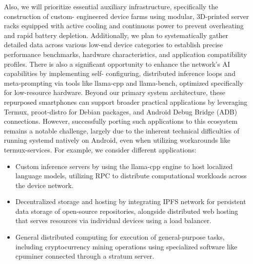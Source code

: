 Also, we will prioritize essential auxiliary infrastructure, specifically the construction of custom- engineered device farms using modular, 3D-printed server racks equipped with active cooling and continuous power to prevent overheating and rapid battery depletion. Additionally, we plan to systematically gather detailed data across various low-end device categories to establish precise performance benchmarks, hardware characteristics, and application compatibility profiles. There is also a significant opportunity to enhance the network's AI capabilities by implementing self- configuring, distributed inference loops and meta-prompting via tools like llama-cpp and llama-bench, optimized specifically for low-resource hardware. Beyond our primary system architecture, these repurposed smartphones can support broader practical applications by leveraging Termux, proot-distro for Debian packages, and Android Debug Bridge (ADB) connections. However, successfully porting such applications to this ecosystem remains a notable challenge, largely due to the inherent technical difficulties of running systemd natively on Android, even when utilizing workarounds like termux-services. For example, we consider different applications:
\begin{itemize}
    \item Custom inference servers by using the llama-cpp engine to host localized language models, utilizing RPC to distribute computational workloads across the device network.
    \item Decentralized storage and hosting by integrating IPFS network for persistent data storage of open-source repositories, alongside distributed web hosting that serves resources via individual devices using a load balancer.
    \item General distributed computing for execution of general-purpose tasks, including cryptocurrency mining operations using specialized software like cpuminer connected through a stratum server.
\end{itemize}
